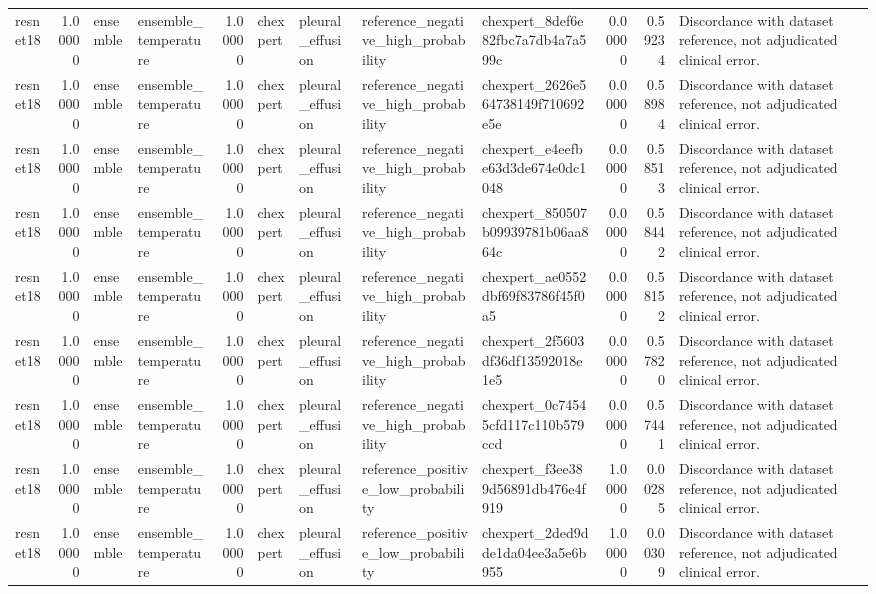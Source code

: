 \begin{tabular}{lrllrllllrrl}
resnet18 & 1.00000 & ensemble & ensemble\_temperature & 1.00000 & chexpert & pleural\_effusion & reference\_negative\_high\_probability & chexpert\_8def6e82fbc7a7db4a7a599c & 0.00000 & 0.59234 & Discordance with dataset reference, not adjudicated clinical error. \\
resnet18 & 1.00000 & ensemble & ensemble\_temperature & 1.00000 & chexpert & pleural\_effusion & reference\_negative\_high\_probability & chexpert\_2626e564738149f710692e5e & 0.00000 & 0.58984 & Discordance with dataset reference, not adjudicated clinical error. \\
resnet18 & 1.00000 & ensemble & ensemble\_temperature & 1.00000 & chexpert & pleural\_effusion & reference\_negative\_high\_probability & chexpert\_e4eefbe63d3de674e0dc1048 & 0.00000 & 0.58513 & Discordance with dataset reference, not adjudicated clinical error. \\
resnet18 & 1.00000 & ensemble & ensemble\_temperature & 1.00000 & chexpert & pleural\_effusion & reference\_negative\_high\_probability & chexpert\_850507b09939781b06aa864c & 0.00000 & 0.58442 & Discordance with dataset reference, not adjudicated clinical error. \\
resnet18 & 1.00000 & ensemble & ensemble\_temperature & 1.00000 & chexpert & pleural\_effusion & reference\_negative\_high\_probability & chexpert\_ae0552dbf69f83786f45f0a5 & 0.00000 & 0.58152 & Discordance with dataset reference, not adjudicated clinical error. \\
resnet18 & 1.00000 & ensemble & ensemble\_temperature & 1.00000 & chexpert & pleural\_effusion & reference\_negative\_high\_probability & chexpert\_2f5603df36df13592018e1e5 & 0.00000 & 0.57820 & Discordance with dataset reference, not adjudicated clinical error. \\
resnet18 & 1.00000 & ensemble & ensemble\_temperature & 1.00000 & chexpert & pleural\_effusion & reference\_negative\_high\_probability & chexpert\_0c74545cfd117c110b579ccd & 0.00000 & 0.57441 & Discordance with dataset reference, not adjudicated clinical error. \\
resnet18 & 1.00000 & ensemble & ensemble\_temperature & 1.00000 & chexpert & pleural\_effusion & reference\_positive\_low\_probability & chexpert\_f3ee389d56891db476e4f919 & 1.00000 & 0.00285 & Discordance with dataset reference, not adjudicated clinical error. \\
resnet18 & 1.00000 & ensemble & ensemble\_temperature & 1.00000 & chexpert & pleural\_effusion & reference\_positive\_low\_probability & chexpert\_2ded9dde1da04ee3a5e6b955 & 1.00000 & 0.00309 & Discordance with dataset reference, not adjudicated clinical error. \\

\end{tabular}
